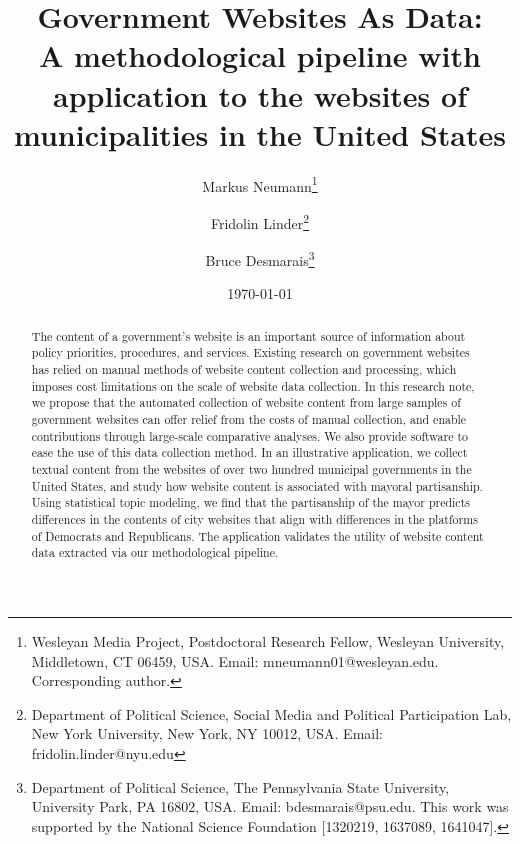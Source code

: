 \documentclass[11pt]{article}
\title{\vspace{-2cm} Government Websites As Data: \\ A methodological pipeline with application to the websites of municipalities in the United States}
\author{ Markus Neumann\footnote{Wesleyan Media Project, Postdoctoral Research Fellow,  Wesleyan University, Middletown, CT 06459, USA. Email: mneumann01@wesleyan.edu. Corresponding author.} \and Fridolin Linder\footnote{Department of Political Science, Social Media and Political Participation Lab, New York University, New York, NY 10012, USA. Email: fridolin.linder@nyu.edu} \and Bruce Desmarais\footnote{Department of Political Science, The Pennsylvania State University, University Park, PA 16802, USA. Email: bdesmarais@psu.edu. This work was supported by the National Science Foundation [1320219, 1637089, 1641047].}} \date{\today}
\begin{document}
\maketitle 




\begin{abstract}

The content of a government's website is an important source of information about policy priorities,  procedures, and services. Existing research on government websites has relied on manual methods of website content collection and processing, which imposes cost limitations on the scale of website data collection. In this research note, we propose that the automated collection of website content from large samples of government websites can offer relief from the costs of manual collection, and enable contributions through large-scale comparative analyses.  We also provide software to ease the use of this data collection method. In an illustrative application, we collect textual content from the websites of over two hundred municipal governments in the United States, and study how website content is associated with mayoral partisanship. Using statistical topic modeling, we find that the partisanship of the mayor predicts differences in the contents of city websites that align with differences in the platforms of Democrats and Republicans. The application validates the utility of website content data extracted via our methodological pipeline.


\end{abstract}
\thispagestyle{empty}
\doublespacing
\end{document}
